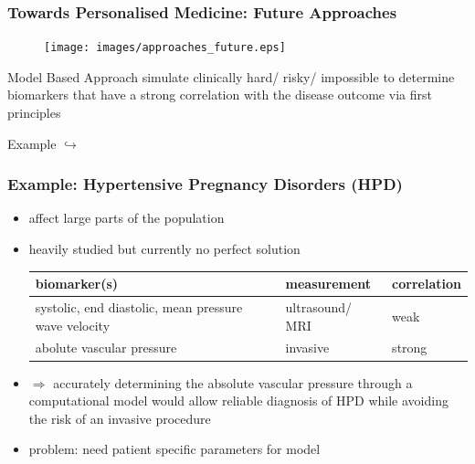 \documentclass{beamer}
\begin{document}
\begin{frame}
	\frametitle{Towards Personalised Medicine: Future Approaches}
	\begin{minipage}{0.59\textwidth}
		\begin{figure}[H]
			\texttt{[image: images/approaches\_future.eps]}
		\end{figure}
	\end{minipage} \hfill
	\begin{minipage}{0.39\textwidth}
		\begin{block}{Model Based Approach}
			simulate clinically hard/ risky/ impossible to determine biomarkers that have a strong correlation with the disease outcome via first principles 
		\end{block}
		\begin{block}{Example}
			$\hookrightarrow$
		\end{block}
	\end{minipage}
\end{frame}
\begin{frame}
	\frametitle{Example: Hypertensive Pregnancy Disorders (HPD)}
	\begin{itemize}
		\item affect large parts of the population
		\item heavily studied but currently no perfect solution 
			\begin{tabular}{| m{5cm} | m{2cm}| m{2cm} |  } 
				\hline
				biomarker(s) & measurement & correlation \\ 
				\hline
				\hline
				systolic, end diastolic, mean pressure wave velocity & ultrasound/ MRI & weak \\ 
				\hline
				abolute vascular pressure & invasive & strong \\ 
				\hline
			\end{tabular}
		\item
			$\Rightarrow$ accurately determining the absolute vascular pressure through a computational model would allow reliable diagnosis of HPD while avoiding the risk of an invasive procedure
		\item problem: need patient specific parameters for model
	\end{itemize}

\end{frame}
\end{document}
